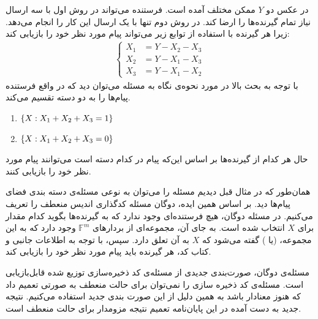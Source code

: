 \begin{example}
\begin{minipage}{0.5\textwidth}
	\end{minipage}
	\newline
	 در عکس دو $Y$ ممکن مختلف آمده است. فرستنده می‌تواند در روش اول با سه ارسال نیاز تمام گیرنده‌ها را ارضا کند. در روش دوم تنها با یک ارسال این کار را انجام می‌دهد. زیرا هر گیرنده با استفاده از توابع زیر می‌تواند پیام مورد نظر خود را بازیابی کند:
	\begin{align*}
		\begin{cases}
				X_1 &= Y - X_2 - X_3 \\
				X_2 &= Y - X_1 - X_3  \\
				X_3 &= Y - X_1 - X_2  
			\end{cases}   
	\end{align*}
	با توجه به بحث بالا در مورد نحوه‌ی نگاه به مسئله می‌توان دید که در واقع فرستنده پیام‌ها را به دو دسته تقسیم می‌کند.
		\begin{enumerate}
			\centering
			\item $\left\{ X: X_1 + X_2 + X_3 = 1 \right\}$
			\item $\left\{ X: X_1 + X_2 + X_3 = 0 \right\}$
		\end{enumerate}
	حال هر کدام از گیرنده‌ها بر اساس این‌که پیام در کدام دسته است می‌توانند پیام مورد نظر خود را بازیابی کنند.
\end{example}

همان‌طور که در مثال قبل دیدیم مسئله 
\icod
 را می‌توان به نوعی مسئله‌ی دسته بندی فضای پیام‌ها دید. بر اساس همین ایده، دوگان مسئله کدگذاری  اندیس منعطف را تعریف می‌کنیم. در مسئله دوگان، هیچ فرستنده‌ای وجود ندارد که به گیرنده‌ها بگوید کدام مقدار برای $X$ انتخاب شده است. به جای آن، مجموعه‌ای از بردارهای
  $\mathbb{F}^m$
   وجود دارد که به این مجموعه،
 (یا 
 )
 گفته می‌شود که $X$ به آن تعلق دارد. سپس، با توجه به اطلاعات جانبی و کتاب کد، هر گیرنده باید پیام مورد نظر خود را بازیابی کند.
\begin{observation}
	مسئله‌ی دوگان، صورت‌بندی جدیدی از مسئله‌ی کد ذخیره‌سازی توزیع شده قابل‌بازیابی است. مسئله‌ی کد ذخیره سازی را نمی‌توان برای حالت منعطف به صورتی تعمیم داد که هنوز معنادار باشد به همین دلیل از این صورت بندی جدید استفاده می‌کنیم. نتیجه جدید به دست آمده در این پایان‌نامه تعمیم نتیجه مزومدار برای حالت منعطف است.
\end{observation}


